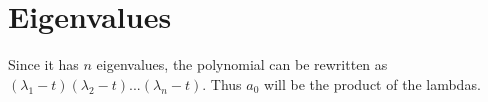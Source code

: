 \section{Eigenvalues}
Since it has $n$ eigenvalues, the polynomial can be rewritten as
$(\lambda_1 - t)(\lambda_2 - t)...(\lambda_n - t)$.
Thus $a_0$ will be the product of the lambdas.